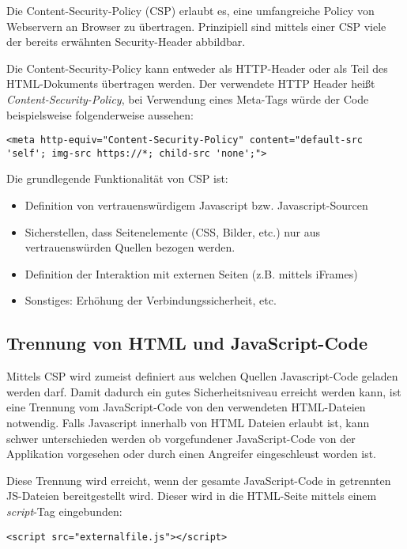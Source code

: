 Die Content-Security-Policy (CSP) erlaubt es, eine umfangreiche Policy von Webservern an Browser zu übertragen. Prinzipiell sind mittels einer CSP viele der bereits erwähnten Security-Header abbildbar.

Die Content-Security-Policy kann entweder als HTTP-Header oder als Teil des HTML-Dokuments übertragen werden. Der verwendete HTTP Header heißt \textit{Content-Security-Policy}, bei Verwendung eines Meta-Tags würde der Code beispielsweise folgenderweise aussehen:

\begin{verbatim}
<meta http-equiv="Content-Security-Policy" content="default-src 'self'; img-src https://*; child-src 'none';">
\end{verbatim}

Die grundlegende Funktionalität von CSP ist:

\begin{itemize}
	\item Definition von vertrauenswürdigem Javascript bzw. Javascript-Sourcen
	\item Sicherstellen, dass Seitenelemente (CSS, Bilder, etc.) nur aus vertrauenswürden Quellen bezogen werden.
	\item Definition der Interaktion mit externen Seiten (z.B. mittels iFrames)
	\item Sonstiges: Erhöhung der Verbindungssicherheit, etc.
\end{itemize}

\subsection{Trennung von HTML und JavaScript-Code}

Mittels CSP wird zumeist definiert aus welchen Quellen Javascript-Code geladen werden darf. Damit dadurch ein gutes Sicherheitsniveau erreicht werden kann, ist eine Trennung vom JavaScript-Code von den verwendeten HTML-Dateien notwendig. Falls Javascript innerhalb von HTML Dateien erlaubt ist, kann schwer unterschieden werden ob vorgefundener JavaScript-Code von der Applikation vorgesehen oder durch einen Angreifer eingeschleust worden ist.

Diese Trennung wird erreicht, wenn der gesamte JavaScript-Code in getrennten JS-Dateien bereitgestellt wird. Dieser wird in die HTML-Seite mittels einem \textit{script}-Tag eingebunden:

\begin{verbatim}
<script src="externalfile.js"></script>
\end{verbatim}

